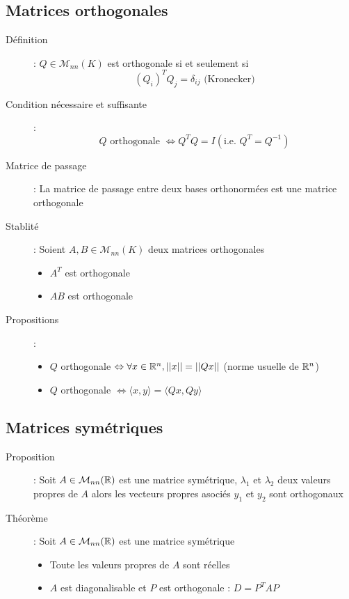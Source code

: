 \subsection{Matrices orthogonales}
\begin{description}
\item[Définition] : $Q\in\mathcal M_{nn}(K)$ est orthogonale si et seulement si
    \[ (Q_i)^TQ_j=\delta_{ij}\textrm{ (Kronecker)} \]
\item[Condition nécessaire et suffisante] : 
    \[ Q\textrm{ orthogonale }\Leftrightarrow Q^TQ=I (\textrm{i.e. } Q^T=Q^{-1}) \]
\item[Matrice de passage] : La matrice de passage entre deux bases orthonormées est une matrice orthogonale
\item[Stablité] : Soient $A,B\in\mathcal M_{nn}(K)$ deux matrices orthogonales
    \begin{itemize}
        \item $A^T$ est orthogonale
        \item $AB$ est orthogonale
    \end{itemize}
\item[Propositions] : 
    \begin{itemize}
        \item $Q$ orthogonale $\Leftrightarrow\forall x\in\mathbb{R}^n, ||x||=||Qx||$ (norme usuelle de $\mathbb{R}^n$)
        \item $Q$ orthogonale $\Leftrightarrow\langle x,y\rangle=\langle Qx,Qy\rangle$
    \end{itemize}
\end{description}
\subsection{Matrices symétriques}
\begin{description}
\item[Proposition] : Soit $A\in\mathcal M_{nn}(\mathbb{R})$ est une matrice symétrique, $\lambda_1$ et $\lambda_2$ deux valeurs propres de $A$ alors les vecteurs propres
asociés $y_1$ et $y_2$ sont orthogonaux
\item[Théorème] : Soit $A\in\mathcal M_{nn}(\mathbb{R})$ est une matrice symétrique
    \begin{itemize}
        \item Toute les valeurs propres de $A$ sont réelles
        \item $A$ est diagonalisable et $P$ est orthogonale : $D=P^TAP$
    \end{itemize}
\end{description}
